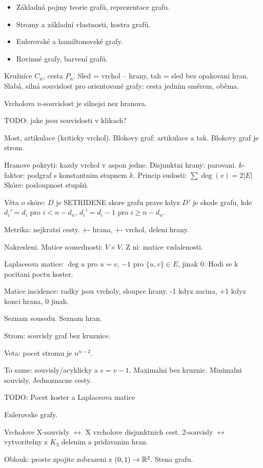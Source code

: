 \begin{itemize}
\item Základná pojmy teorie grafů, reprezentace grafu.
\item Stromy a základní vlastnosti, kostra grafů.
\item Eulerovské a hamiltonovské grafy.
\item Rovinné grafy, barvení grafů.
\end{itemize}

Kružníce $C_n$, cesta $P_n$.
Sled = vrchol -- hrany, tah = sled bez opakovani hran.
Slabá, silná souvislost pro orientované grafy:
cesta jedním směrem, oběma.

Vrcholova $n$-souvislost je silnejsi nez hranova.

TODO: jake jsou souvislosti v klikach?

Most, artikulace (kriticky vrchol).
Blokovy graf: artikulace a tak. Blokovy graf je strom.

Hranove pokryti: kazdy vrchol v aspon jedne.
Disjunktni hrany: parovani.
$k$-faktor: podgraf s konstantnim stupnem $k$.
Princip sudosti: $\sum\deg(v)=2|E|$
Skóre: posloupnost stupňů.

Věta o skóre: $D$ je SETRIDENE skore grafu prave kdyz $D'$
je skode grafu, kde $d_i'=d_i$ pro $i<n-d_n$,
$d_i'=d_i-1$ pro $i\geq n-d_n$.

Metrika: nejkratsi cesty.
+- hrana, +- vrchol, deleni hrany.

Nakresleni.
Matice sousednosti: $V\times V$.
Z ni: matice vzdalenosti.

Laplaceova matice: $\deg u$ pro $u=v$, $-1$ pro $\{u,v\}\in E$,
jinak 0. Hodi se k pocitani poctu koster.

Matice incidence: radky jsou vrcholy, sloupce hrany.
-1 kdyz zacina, +1 kdyz konci hrana, 0 jinak.

Seznam sousedu. Seznam hran.

Strom: souvisly graf bez kruznice.

Veta: pocet stromu je $n^{n-2}$.

To same: souvisly/acyklicky a $e=v-1$.
Maximalni bez kruznic. Minimalni souvisly.
Jednoznacne cesty.

TODO: Pocet koster a Laplaceova matice

Eulerovske grafy.

Vrcholove X-souvisly $\leftrightarrow$ X vrcholove disjunktnich cest.
2-souvisly $\leftrightarrow$ vytvoritelny z $K_3$ delenim a pridavanim hran.

Oblouk: proste zpojite zobrazeni z $(0,1)\rightarrow\mathbb{R}^2$.
Stena grafu.

